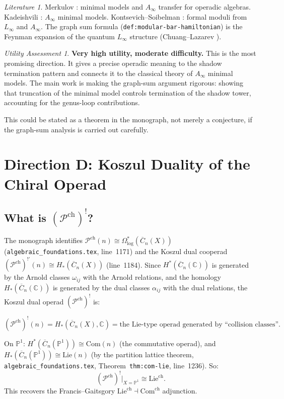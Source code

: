 \documentclass[11pt]{article}
\theoremstyle{definition}
\theoremstyle{remark}
\newtheorem*{assessment}{Utility Assessment}
\newtheorem*{literature}{Literature}
\newcommand{\Pch}{\mathcal{P}^{\mathrm{ch}}}
\newcommand{\FM}{\overline{C}}
\begin{document}
\begin{literature}
Merkulov \cite{Mer10}: minimal models and $A_\infty$ transfer for
operadic algebras.  Kadeishvili \cite{Kad80}: $A_\infty$ minimal
models.  Kontsevich--Soibelman \cite{KS06}: formal moduli from
$L_\infty$ and $A_\infty$.  The graph sum formula
(\texttt{def:modular-bar-hamiltonian}) is the Feynman expansion of
the quantum $L_\infty$ structure
(Chuang--Lazarev \cite{CL10}).
\end{literature}

\begin{assessment}
\textbf{Very high utility, moderate difficulty.}  This is the most
promising direction.  It gives a precise operadic meaning to the
shadow termination pattern and connects it to the classical theory
of $A_\infty$ minimal models.  The main work is making the
graph-sum argument rigorous: showing that truncation of the
minimal model controls termination of the shadow tower, accounting
for the genus-loop contributions.

This could be stated as a theorem in the monograph, not merely a
conjecture, if the graph-sum analysis is carried out carefully.
\end{assessment}

\section{Direction D: Koszul Duality of the Chiral Operad}

\subsection{What is $(\Pch)^!$?}

The monograph identifies $\Pch(n) \cong \Omega^*_{\log}(\FM_n(X))$
(\texttt{algebraic\_foundations.tex}, line~1171) and the Koszul dual
cooperad $(\Pch)^{!\prime}(n) \cong H_*(\FM_n(X))$ (line~1184).
Since $H^*(\FM_n(\mathbb{C}))$ is generated by the Arnold classes
$\omega_{ij}$ with the Arnold relations, and the homology
$H_*(\FM_n(\mathbb{C}))$ is generated by the dual classes
$\alpha_{ij}$ with the dual relations, the Koszul dual operad
$(\Pch)^!$ is:

\[
(\Pch)^!(n) = H_*(\FM_n(X), \mathbb{C})
= \text{the Lie-type operad generated by ``collision classes''.}
\]

On $\mathbb{P}^1$:
$H^*(\FM_n(\mathbb{P}^1)) \cong \mathrm{Com}(n)$ (the commutative
operad), and
$H_*(\FM_n(\mathbb{P}^1)) \cong \mathrm{Lie}(n)$ (by the partition
lattice theorem, \texttt{algebraic\_foundations.tex},
Theorem~\texttt{thm:com-lie}, line~1236).  So:
\[
(\Pch)^! \Big|_{X = \mathbb{P}^1}
\cong \mathrm{Lie}^{\mathrm{ch}}.
\]
This recovers the Francis--Gaitsgory
$\mathrm{Lie}^{\mathrm{ch}} \dashv \mathrm{Com}^{\mathrm{ch}}$
adjunction.
\end{document}
